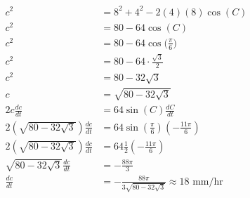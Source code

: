 \documentclass{article}
\begin{document}
\begin{enumerate}
	$$\begin{align}
		c^2 &= 8^2 + 4^2 - 2(4)(8)\cos(C)\\
		c^2 &= 80-64 \cos(C)\\
		c^2 &= 80-64 \cos\Big(\frac{\pi	}{6}\Big) \\
		c^2 &= 80-64 \cdot \frac{\sqrt3}{2}\\
		c^2 &= 80-32\sqrt{3}\\
		c &= \sqrt{80-32\sqrt{3}}\\
		2c\frac{dc}{dt} &= 64 \sin(C) \frac{dC}{dt}\\
		2(\sqrt{80-32\sqrt{3}})\frac{dc}{dt} &= 64 \sin(\frac{\pi}{6}) (-\frac{11\pi}{6})\\
		2(\sqrt{80-32\sqrt{3}})\frac{dc}{dt} &= 64 \frac{1}{2} (-\frac{11\pi}{6})\\
		\sqrt{80-32\sqrt{3}}\frac{dc}{dt} &= -\frac{88\pi}{3}\\
		\frac{dc}{dt} &= -\frac{88\pi}{3\sqrt{80-32\sqrt{3}}} \approx 18 \text{ mm/hr}
	\end{align}$$
\end{enumerate}
\end{document}
